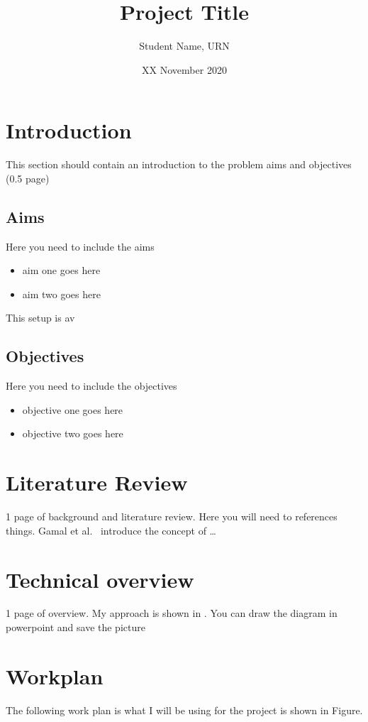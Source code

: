 \documentclass{article}
\title{Project Title}
\author{Student Name, URN}
\date{ XX November 2020}
\begin{document}
\maketitle



\section{Introduction}
This section should contain an introduction to the problem aims and objectives (0.5 page)
\subsection{Aims}
Here you need to include the aims
\begin{itemize}
\item aim one goes here
\item aim two goes here
\end{itemize}

This setup is av
\subsection{Objectives}
Here you need to include the objectives
\begin{itemize}
\item objective one goes here
\item objective two goes here
\end{itemize}

\section{Literature Review}
1 page of background and literature review. Here you will need to references things. Gamal et al.~\cite{gamal} introduce the concept of \ldots

\section{Technical overview}
1 page of overview. My approach is shown in . You can draw the diagram in powerpoint and save the picture

\section{Workplan}
The following work plan is what I will be using for the project is shown in Figure.

\appendix
%
%



\end{document}
